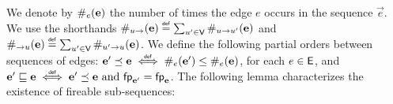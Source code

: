 
We denote by $\#_{e}(\mathbf{e})$ the number of times the edge $e$
occurs in the sequence $\vec{e}$. We use the shorthands
$\#_{{u}\to}(\mathbf{e}) \stackrel{\scriptscriptstyle{\mathsf{def}}}{=} \sum_{u'\in\mathsf{V}}\#_{u \to
  u'}(\mathbf{e})$ and $\#_{\to{u}}(\mathbf{e}) \stackrel{\scriptscriptstyle{\mathsf{def}}}{=}
\sum_{u'\in\mathsf{V}}\#_{u' \to u}(\mathbf{e})$. We define the following
partial orders between sequences of edges: $\mathbf{e'} \preceq \mathbf{e}
\stackrel{\scriptscriptstyle{\mathsf{def}}}{\iff} \#_{e}(\mathbf{e'}) \leq \#_{e}(\mathbf{e})$, for each $e
\in \mathsf{E}$, and $\mathbf{e'} \sqsubseteq \mathbf{e} \stackrel{\scriptscriptstyle{\mathsf{def}}}{\iff} \mathbf{e'}
\preceq \mathbf{e} \text{ and } \mathsf{fp}_{\mathbf{e'}} = \mathsf{fp}_{\mathbf{e}}$.
The following lemma characterizes the existence of fireable
sub-sequences:

